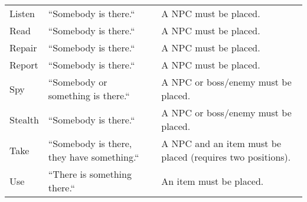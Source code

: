 \begin{table*}[]
{\begin{tabular}{lll}
Listen     & “Somebody is there.“                         & A NPC must be placed.                                      \\
Read       & “Somebody is there.“                         & A NPC must be placed.                                      \\
Repair     & “Somebody is there.“                         & A NPC must be placed.                                      \\
Report     & “Somebody is there.“                         & A NPC must be placed.                                      \\
Spy        & “Somebody or something is there.“            & A NPC or boss/enemy must be placed.                        \\
Stealth    & “Somebody is there.“                         & A NPC or boss/enemy must be placed.                        \\
Take       & “Somebody is there, they have something.“    & A NPC and an item must be placed (requires two positions). \\
Use        & “There is something there.“                  & An item must be placed.                                    \\ \hline
\end{tabular}%
}
\end{table*}